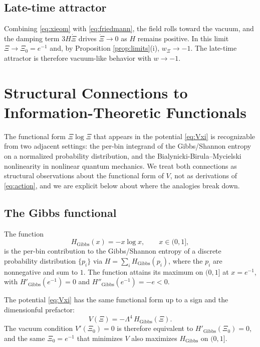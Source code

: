 \documentclass[11pt,reqno]{amsart}
\theoremstyle{plain}
\theoremstyle{definition}
\theoremstyle{remark}
\newcommand{\Gibbs}{\mathrm{Gibbs}}
\begin{document}
\subsection{Late-time attractor}

Combining \eqref{eq:xieom} with \eqref{eq:friedmann}, the field rolls
toward the vacuum, and the damping term $3H\dot\Xi$ drives $\dot\Xi \to 0$
as $H$ remains positive. In this limit $\Xi \to \Xi_0 = e^{-1}$ and, by
Proposition \ref{prop:limits}(i), $w_\Xi \to -1$. The
late-time attractor is therefore vacuum-like behavior with $w \to -1$.

\section{Structural Connections to Information-Theoretic Functionals}\label{sec:entropy}

The functional form $\Xi\log\Xi$ that appears in the potential
\eqref{eq:Vxi} is recognizable from two adjacent settings: the per-bin
integrand of the Gibbs/Shannon entropy on a normalized probability
distribution, and the Bialynicki-Birula--Mycielski nonlinearity in
nonlinear quantum mechanics. We treat both connections as structural
observations about the functional form of $V$, not as derivations of
\eqref{eq:action}, and we are explicit below about where the analogies
break down.

\subsection{The Gibbs functional}

The function
\begin{equation}\label{eq:entropy}
  H_{\Gibbs}(x) = -x \log x,
  \qquad x \in (0,1],
\end{equation}
is the per-bin contribution to the Gibbs/Shannon entropy of a discrete
probability distribution $\{p_i\}$ via $H = \sum_i H_{\Gibbs}(p_i)$,
where the $p_i$ are nonnegative and sum to $1$. The function attains its
maximum on $(0,1]$ at $x = e^{-1}$, with $H'_{\Gibbs}(e^{-1}) = 0$ and
$H''_{\Gibbs}(e^{-1}) = -e < 0$.

The potential \eqref{eq:Vxi} has the same functional form up to a sign
and the dimensionful prefactor:
\begin{equation}\label{eq:formal-rel}
  V(\Xi) = -\Lambda^{4}\,H_{\Gibbs}(\Xi).
\end{equation}
The vacuum condition $V'(\Xi_0) = 0$ is therefore equivalent to
$H'_{\Gibbs}(\Xi_0) = 0$, and the same $\Xi_0 = e^{-1}$ that minimizes
$V$ also maximizes $H_{\Gibbs}$ on $(0,1]$.
\end{document}
